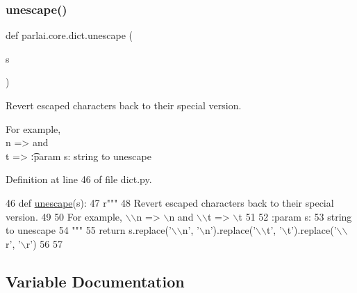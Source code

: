 \subsubsection{\texorpdfstring{unescape()}{unescape()}}
{\footnotesize\ttfamily def parlai.\+core.\+dict.\+unescape (\begin{DoxyParamCaption}\item[{}]{s }\end{DoxyParamCaption})}

\begin{DoxyVerb}Revert escaped characters back to their special version.

For example, \\n => \n and \\t => \t

:param s:
    string to unescape
\end{DoxyVerb}
 

Definition at line 46 of file dict.\+py.


\begin{DoxyCode}
46 \textcolor{keyword}{def }\hyperlink{namespaceparlai_1_1core_1_1dict_a4d8952ff127b540967c707a58e8ebb48}{unescape}(s):
47     \textcolor{stringliteral}{r"""}
48 \textcolor{stringliteral}{    Revert escaped characters back to their special version.}
49 \textcolor{stringliteral}{}
50 \textcolor{stringliteral}{    For example, \(\backslash\)\(\backslash\)n => \(\backslash\)n and \(\backslash\)\(\backslash\)t => \(\backslash\)t}
51 \textcolor{stringliteral}{}
52 \textcolor{stringliteral}{    :param s:}
53 \textcolor{stringliteral}{        string to unescape}
54 \textcolor{stringliteral}{    """}
55     \textcolor{keywordflow}{return} s.replace(\textcolor{stringliteral}{'\(\backslash\)\(\backslash\)n'}, \textcolor{stringliteral}{'\(\backslash\)n'}).replace(\textcolor{stringliteral}{'\(\backslash\)\(\backslash\)t'}, \textcolor{stringliteral}{'\(\backslash\)t'}).replace(\textcolor{stringliteral}{'\(\backslash\)\(\backslash\)r', '}\(\backslash\)r')
56 
57 
\end{DoxyCode}


\subsection{Variable Documentation}
\mbox{\label{namespaceparlai_1_1core_1_1dict_a55194215927ea8786279b5089781ce64}} 
